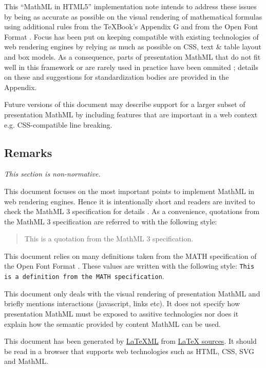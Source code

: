 This ``MathML in HTML5'' implementation note intends to address these issues by
being as accurate as
possible on the visual rendering of mathematical formulas using additional
rules from the \TeX Book's Appendix G \cite{TeXBook} and from
the Open Font Format \cite{OpenFontFormat3}.
Focus has been put on keeping compatible with existing technologies of web
rendering engines \cite{HTML5} by relying as much as possible on CSS, text \&
table layout and box models. As a consequence, parts of presentation MathML
that do not fit well in this framework or are rarely used in practice
have been ommited ; details on these and suggestions for standardization bodies
are provided in the Appendix.

Future versions of this document may describe support for a larger subset
of presentation MathML by including features that are important in a web context
e.g. CSS-compatible line breaking.

\subsection{Remarks}

{\em This section is non-normative.}

This document focuses on the most important points to implement
MathML in web rendering engines. Hence it is intentionally short and readers are
invited to check the MathML 3 specification for details \cite{MathML3}.
As a convenience, quotations from the MathML 3 specification are referred to
with the following style:
\begin{quote}
  This is a quotation from the MathML 3 specification.
\end{quote}

This document relies on many definitions taken from the MATH specification
of the Open Font Format \cite{OpenFontFormat3}. These values are written with
the following style:
{\tt This is a definition from the MATH specification}.

This document only deals with the visual rendering of presentation MathML
and briefly mentions interactions (javascript, links etc). It does not specify
how presentation MathML must be exposed to assitive technologies nor does it
explain how the semantic provided by content MathML can be used.

This document has been generated by
\href{http://dlmf.nist.gov/LaTeXML/}{LaTeXML} from
\href{https://github.com/MathML/MathMLinHTML5}{LaTeX sources}. It
should be read in a browser that supports web technologies
such as HTML, CSS, SVG and MathML.

